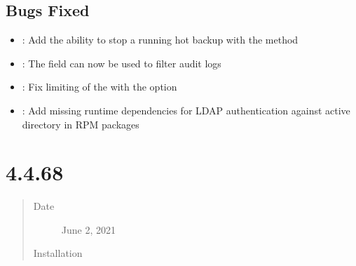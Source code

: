 \documentclass[letterpaper,10pt,english]{sphinxmanual}
\begin{document}
\subsection{Bugs Fixed}
\label{\detokenize{release_notes/4.4.8-9:bugs-fixed}}\begin{itemize}
\item {} 
\sphinxAtStartPar
{}: Add the ability to stop a running hot backup with the   method

\item {} 
\sphinxAtStartPar
{}: The  field can now be used to filter audit logs

\item {} 
\sphinxAtStartPar
{}: Fix limiting of the {\hyperref[\detokenize{rate-limit:rate-limit}]{}} with the  option

\item {} 
\sphinxAtStartPar
{}: Add missing runtime dependencies for LDAP authentication against active directory in RPM packages

\end{itemize}


\section{ 4.4.6\sphinxhyphen{}8}
\label{\detokenize{release_notes/4.4.6-8:percona-server-for-mongodb-4-4-6-8}}\label{\detokenize{release_notes/4.4.6-8:psmdb-4-4-6-8}}\label{\detokenize{release_notes/4.4.6-8::doc}}\begin{quote}\begin{description}
\item[{Date}] \leavevmode
\sphinxAtStartPar
June 2, 2021

\item[{Installation}] \leavevmode
\sphinxAtStartPar
{}

\end{description}\end{quote}
\end{document}
